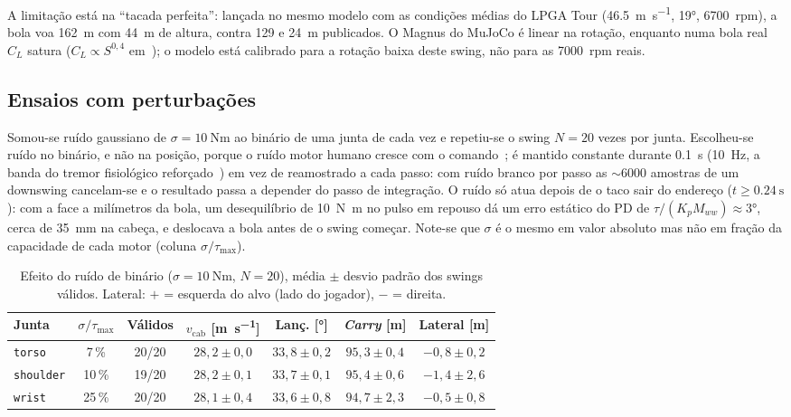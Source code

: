 \documentclass[11pt,a4paper]{article}
\begin{document}
A limitação está na ``tacada perfeita'': lançada no mesmo modelo com as
condições médias do LPGA Tour (\SI{46.5}{\meter\per\second}, \ang{19},
\SI{6700}{rpm}), a bola voa \SI{162}{\meter} com \SI{44}{\meter} de altura,
contra 129 e \SI{24}{\meter} publicados. O Magnus do MuJoCo é linear na
rotação, enquanto numa bola real $C_L$ satura ($C_L \propto S^{0{,}4}$
em~\cite{smits1994}); o modelo está calibrado para a rotação baixa deste swing,
não para as 7000~rpm reais.

\subsection{Ensaios com perturbações}
\label{sec:pert}

Somou-se ruído gaussiano de $\sigma = \SI{10}{\newton\meter}$ ao binário de uma
junta de cada vez e repetiu-se o swing $N=20$ vezes por junta. Escolheu-se
ruído no binário, e não na posição, porque o ruído motor humano cresce com o
comando~\cite{harris1998}; é mantido constante durante \SI{0.1}{\second}
(\SI{10}{\hertz}, a banda do tremor fisiológico
reforçado~\cite{elble1990,deuschl1998}) em vez de reamostrado a cada passo: com
ruído branco por passo as $\sim$6000 amostras de um downswing cancelam-se e o
resultado passa a depender do passo de integração. O ruído só atua depois de o
taco sair do endereço ($t \geq \SI{0.24}{\second}$): com a face a milímetros
da bola, um desequilíbrio de \SI{10}{\newton\meter} no pulso em repouso dá um
erro estático do PD de $\tau/(K_p M_{ww}) \approx \ang{3}$, cerca de
\SI{35}{\milli\meter} na cabeça, e deslocava a bola antes de o swing começar.
Note-se que $\sigma$ é o mesmo em valor absoluto mas não em fração da
capacidade de cada motor (coluna $\sigma/\tau_{\max}$).

\begin{table}[h]
\centering
\caption{Efeito do ruído de binário ($\sigma=\SI{10}{\newton\meter}$, $N=20$),
média $\pm$ desvio padrão dos swings válidos. Lateral: $+$ = esquerda do alvo
(lado do jogador), $-$ = direita.}
\label{tab:pert}
\small
\begin{tabular}{lcccccc}
\toprule
Junta & $\sigma/\tau_{\max}$ & Válidos & $v_{\text{cab}}$ [\si{\meter\per\second}] & Lanç. [\si{\degree}] & \emph{Carry} [\si{\meter}] & Lateral [\si{\meter}] \\
\midrule
\texttt{torso}    & 7\,\%  & 20/20 & $28{,}2 \pm 0{,}0$ & $33{,}8 \pm 0{,}2$ & $95{,}3 \pm 0{,}4$ & $-0{,}8 \pm 0{,}2$ \\
\texttt{shoulder} & 10\,\% & 19/20 & $28{,}2 \pm 0{,}1$ & $33{,}7 \pm 0{,}1$ & $95{,}4 \pm 0{,}6$ & $-1{,}4 \pm 2{,}6$ \\
\texttt{wrist}    & 25\,\% & 20/20 & $28{,}1 \pm 0{,}4$ & $33{,}6 \pm 0{,}8$ & $94{,}7 \pm 2{,}3$ & $-0{,}5 \pm 0{,}8$ \\
\bottomrule
\end{tabular}
\end{table}
\end{document}
